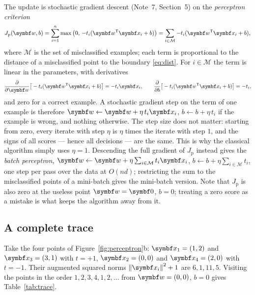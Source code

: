 \documentclass[11pt]{article}
\newcommand{\w}{\vect{w}}
\begin{document}
The update is stochastic gradient descent (Note~7, Section~5) on the \emph{perceptron criterion}
\[
  J_{\mathrm p}(\w, b) = \sum_{i=1}^n \max\big(0,\, -t_i(\w\T\x_i + b)\big) = \sum_{i \in \mathcal M} -t_i(\w\T\x_i + b) ,
\]
where $\mathcal M$ is the set of misclassified examples; each term is proportional to the distance of a misclassified
point to the boundary \eqref{eq:dist}. For $i \in \mathcal M$ the term is linear in the parameters, with derivatives
\[
  \frac{\partial}{\partial \w}\big[-t_i(\w\T\x_i + b)\big] = -t_i\x_i , \qquad
  \frac{\partial}{\partial b}\big[-t_i(\w\T\x_i + b)\big] = -t_i ,
\]
and zero for a correct example. A stochastic gradient step on the term of one example is therefore $\w \gets \w +
\eta\,t_i\x_i$, $b \gets b + \eta\,t_i$ if the example is wrong, and nothing otherwise. The step size does not matter: starting from zero, every iterate with step $\eta$ is $\eta$ times the
iterate with step $1$, and the signs of all scores --- hence all decisions --- are the same. This is why the classical
algorithm simply uses $\eta = 1$. Descending the full gradient of $J_{\mathrm p}$ instead gives the \emph{batch
perceptron}, $\w \gets \w + \eta\sum_{i \in \mathcal M} t_i\x_i$, $b \gets b + \eta\sum_{i \in \mathcal M} t_i$, one step per
pass over the data at $O(nd)$; restricting the sum to the misclassified points of a mini-batch gives the mini-batch version.
Note that $J_{\mathrm p}$ is also zero at the useless point $\w = \vect{0}$, $b = 0$;
treating a zero score as a mistake is what keeps the algorithm away from it.

\subsection{A complete trace}

Take the four points of Figure~\ref{fig:perceptron}b: $\x_1 = (1, 2)$ and $\x_3 = (3, 1)$ with $t = +1$, $\x_2 = (0, 0)$
and $\x_4 = (2, 0)$ with $t = -1$. Their augmented squared norms $\norm{\x_i}^2 + 1$ are $6, 1, 11, 5$. Visiting the
points in the order $1, 2, 3, 4, 1, 2, \dots$ from $\w = (0, 0)$, $b = 0$ gives Table~\ref{tab:trace}.
\end{document}
